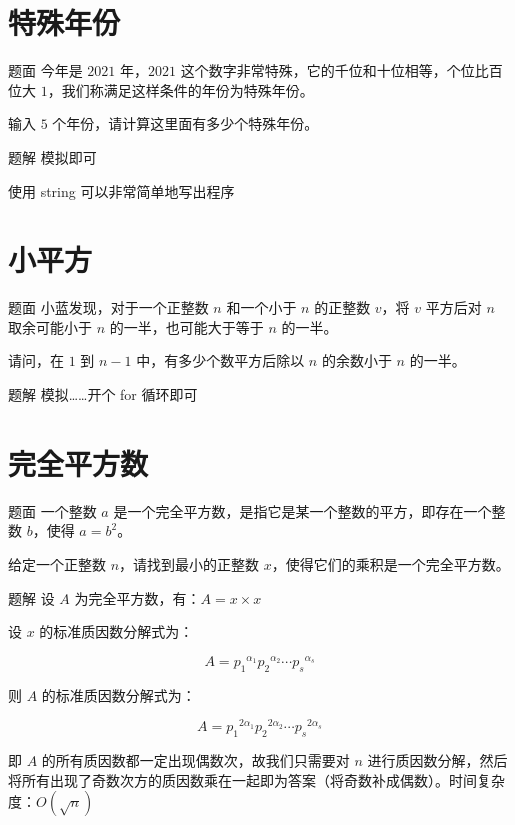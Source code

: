 \documentclass{pptt}
\begin{document}
\section{特殊年份}

\begin{frame}{题面}
    今年是 $2021$ 年，$2021$ 这个数字非常特殊，它的千位和十位相等，个位比百位大 $1$，我们称满足这样条件的年份为特殊年份。

    输入 $5$ 个年份，请计算这里面有多少个特殊年份。
\end{frame}

\begin{frame}{题解}
    模拟即可

    使用 string 可以非常简单地写出程序
\end{frame}

\section{小平方}

\begin{frame}{题面}
    小蓝发现，对于一个正整数 $n$ 和一个小于 $n$ 的正整数 $v$，将 $v$ 平方后对 $n$ 取余可能小于 $n$ 的一半，也可能大于等于 $n$ 的一半。

    请问，在 $1$ 到 $n-1$ 中，有多少个数平方后除以 $n$ 的余数小于 $n$ 的一半。
\end{frame}

\begin{frame}{题解}
    模拟……开个 for 循环即可
\end{frame}

\section{完全平方数}

\begin{frame}{题面}
    一个整数 $a$ 是一个完全平方数，是指它是某一个整数的平方，即存在一个整数 $b$，使得 $a=b^2$。

    给定一个正整数 $n$，请找到最小的正整数 $x$，使得它们的乘积是一个完全平方数。
\end{frame}

\begin{frame}{题解}
    设 $A$ 为完全平方数，有：$A=x \times x$

    设 $x$ 的标准质因数分解式为：

    $$A={p_1}^{\alpha_1}{p_2}^{\alpha_2} \cdots {p_s}^{\alpha_s}$$

    则 $A$ 的标准质因数分解式为：

    $$A={p_1}^{2\alpha_1}{p_2}^{2\alpha_2} \cdots {p_s}^{2\alpha_s}$$

    即 $A$ 的所有质因数都一定出现偶数次，故我们只需要对 $n$ 进行质因数分解，然后将所有出现了奇数次方的质因数乘在一起即为答案（将奇数补成偶数）。时间复杂度：$O(\sqrt{n})$
\end{frame}
\end{document}
